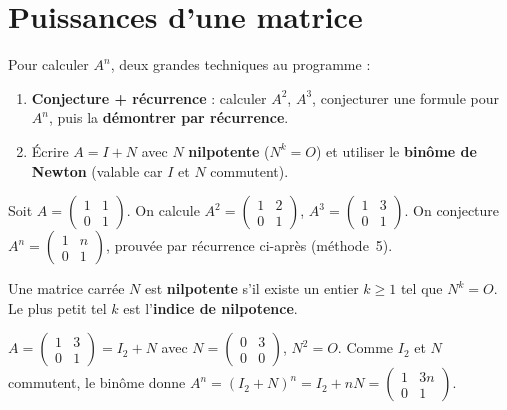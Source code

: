 \section{Puissances d'une matrice}

\begin{aretenir}
Pour calculer $A^n$, deux grandes techniques au programme :
\begin{enumerate}[label=\arabic*)]
\item \textbf{Conjecture + récurrence} : calculer $A^2$, $A^3$, conjecturer une formule pour $A^n$,
puis la \textbf{démontrer par récurrence}.
\item Écrire $A=I+N$ avec $N$ \textbf{nilpotente} ($N^k=O$) et utiliser le \textbf{binôme de Newton}
(valable car $I$ et $N$ commutent).
\end{enumerate}
\end{aretenir}

\begin{exemple}
Soit $A=\begin{pmatrix}1&1\\0&1\end{pmatrix}$. On calcule
$A^2=\begin{pmatrix}1&2\\0&1\end{pmatrix}$, $A^3=\begin{pmatrix}1&3\\0&1\end{pmatrix}$. On
conjecture $A^n=\begin{pmatrix}1&n\\0&1\end{pmatrix}$, prouvée par récurrence ci-après (méthode~5).
\end{exemple}

\begin{definition}
Une matrice carrée $N$ est \textbf{nilpotente} s'il existe un entier $k\ge1$ tel que $N^k=O$.
Le plus petit tel $k$ est l'\textbf{indice de nilpotence}.
\end{definition}

\begin{exemple}
$A=\begin{pmatrix}1&3\\0&1\end{pmatrix}=I_2+N$ avec $N=\begin{pmatrix}0&3\\0&0\end{pmatrix}$,
$N^2=O$. Comme $I_2$ et $N$ commutent, le binôme donne
$A^n=(I_2+N)^n=I_2+nN=\begin{pmatrix}1&3n\\0&1\end{pmatrix}$.
\end{exemple}

